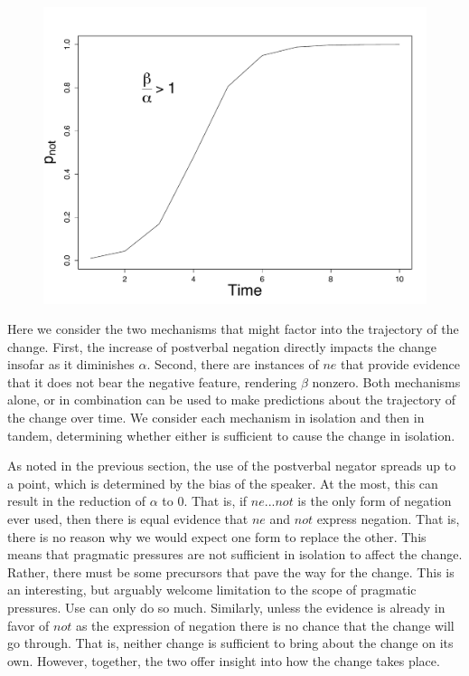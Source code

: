 \begin{figure}
\begin{center}
	 \includegraphics[width=\textwidth]{gain-solution.pdf}\\
\end{center}
	\caption{}
\end{figure}

Here we consider the two mechanisms that might factor into the trajectory of the change. First, the increase of postverbal negation directly impacts the change insofar as it diminishes $\alpha$. Second, there are instances of $ne$ that provide evidence that it does not bear the negative feature, rendering $\beta$ nonzero.  Both mechanisms alone, or in combination can be used to make predictions about the trajectory of the change over time. We consider each mechanism in isolation and then in tandem, determining whether either is sufficient   to cause the change in isolation.


As noted in the previous section, the use of the postverbal negator spreads up to a point, which is determined by the bias of the speaker. At the most, this can result in the reduction of $\alpha$ to $0$. That is, if $ne...not$ is the only form of negation ever used, then there is equal evidence that $ne$ and $not$ express negation. That is, there is no reason why we would expect one form to replace the other. This means that pragmatic pressures are not sufficient in isolation to affect the change. Rather, there must be some precursors that pave the way for the change. This is an interesting, but arguably welcome limitation to the scope of pragmatic pressures. Use can only do so much.  Similarly, unless the evidence is already in favor of $not$ as the expression of negation there is no chance that the change will go through. That is, neither change is sufficient to bring about the change on its own. However, together, the two offer insight into how the change takes place.

